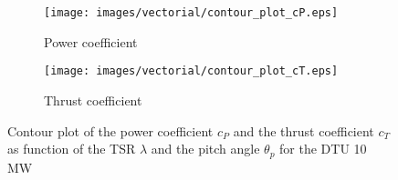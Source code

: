 \begin{figure}[htb]
    \centering
    \begin{subfigure}{0.49\textwidth}
    \centering
    \texttt{[image: images/vectorial/contour\_plot\_cP.eps]}
    \caption{Power coefficient}
    \label{fig:contour_cp}
    \end{subfigure}
    \begin{subfigure}{0.49\textwidth}
    \centering
    \texttt{[image: images/vectorial/contour\_plot\_cT.eps]}
    \caption{Thrust coefficient}
    \label{fig:contour_cT}
    \end{subfigure}
    \caption{Contour plot of the power coefficient $c_P$ and  the thrust coefficient $c_T$ as function of the \acrlong{TSR} $\lambda$ and the pitch angle $\theta_p$ for the DTU 10 MW}
    \label{fig:contour_plot}
\end{figure}

